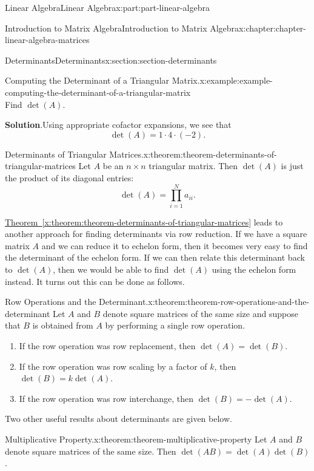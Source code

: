 \documentclass[twoside,10pt,]{book}
\newcommand{\blocktitlefont}{\relax}
\newcommand{\xreffont}{\relax}
\numberwithin{equation}{part}
\begin{document}
\begin{partptx}{Linear Algebra}{}{Linear Algebra}{}{}{x:part:part-linear-algebra}
\begin{chapterptx}{Introduction to Matrix Algebra}{}{Introduction to Matrix Algebra}{}{}{x:chapter:chapter-linear-algebra-matrices}
\begin{sectionptx}{Determinants}{}{Determinants}{}{}{x:section:section-determinants}
\begin{example}{Computing the Determinant of a Triangular Matrix.}{x:example:example-computing-the-determinant-of-a-triangular-matrix}
\begin{equation*}
\end{equation*}
Find \(\det(A)\).%
\par\smallskip%
\noindent\textbf{\blocktitlefont Solution}.\hypertarget{g:solution:idm1650256792}{}\quad{}Using appropriate cofactor expansions, we see that%
\begin{equation*}
\det(A) = 1\cdot4\cdot(-2).
\end{equation*}
%
\end{example}
\begin{theorem}{Determinants of Triangular Matrices.}{}{x:theorem:theorem-determinants-of-triangular-matrices}%
%
Let \(A\) be an \(n\times n\) triangular matrix. Then \(\det(A)\) is just the product of its diagonal entries:%
\begin{equation*}
\det(A) = \prod_{i=1}^{N}a_{ii}.
\end{equation*}
%
\end{theorem}
\hyperref[x:theorem:theorem-determinants-of-triangular-matrices]{Theorem~{\xreffont\ref{x:theorem:theorem-determinants-of-triangular-matrices}}} leads to another approach for finding determinants via row reduction. If we have a square matrix \(A\) and we can reduce it to echelon form, then it becomes very easy to find the determinant of the echelon form. If we can then relate this determinant back to \(\det(A)\), then we would be able to find \(\det(A)\) using the echelon form instead. It turns out this can be done as follows.%
\begin{theorem}{Row Operations and the Determinant.}{}{x:theorem:theorem-row-operations-and-the-determinant}%
Let \(A\) and \(B\) denote square matrices of the same size and suppose that \(B\) is obtained from \(A\) by performing a single row operation.%
%
\begin{enumerate}
\item{}If the row operation was row replacement, then \(\det(A) = \det(B)\).%
\item{}If the row operation was row scaling by a factor of \(k\), then \(\det(B) = k\det(A)\).%
\item{}If the row operation was row interchange, then \(\det(B) = -\det(A)\).%
\end{enumerate}
\end{theorem}
Two other useful results about determinants are given below.%
\begin{theorem}{Multiplicative Property.}{}{x:theorem:theorem-multiplicative-property}%
Let \(A\) and \(B\) denote square matrices of the same size. Then \(\det(AB) = \det(A)\det(B)\).%

\end{theorem}
\end{sectionptx}
\end{chapterptx}
\end{partptx}
\end{document}
